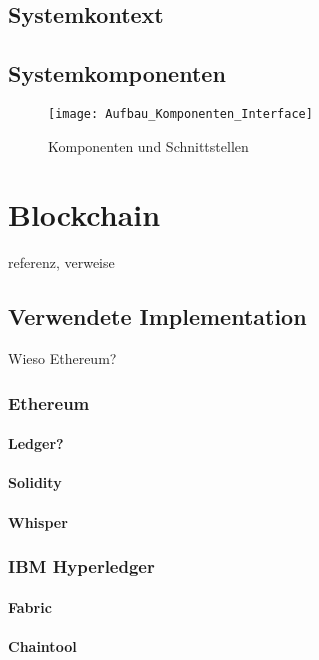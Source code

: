 \subsection{Systemkontext}

\subsection{Systemkomponenten}

\begin{figure}
\centering
\texttt{[image: Aufbau\_Komponenten\_Interface]}
\caption{Komponenten und Schnittstellen}
\label{fig:Aufbau Komponenten und Schnittstellen}
\end{figure}



\section{Blockchain}
\label{sec:Blockchain}
referenz, verweise

\subsection{Verwendete Implementation}
Wieso Ethereum?

\subsubsection{Ethereum}
\paragraph{Ledger?}
\paragraph{Solidity}
\paragraph{Whisper}
\subsubsection{IBM Hyperledger}
\paragraph{Fabric}
\paragraph{Chaintool}


